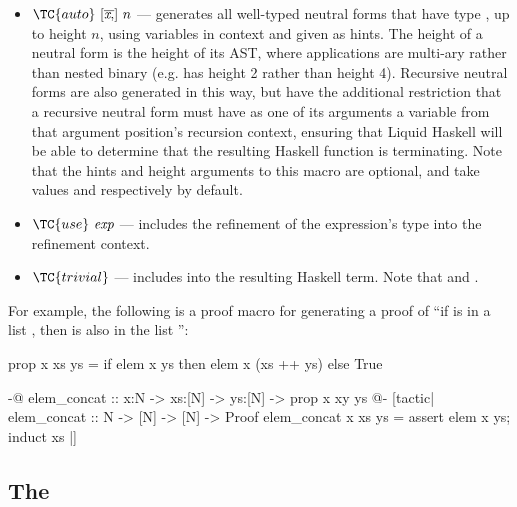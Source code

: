\begin{itemize}
\begin{itemize}
    \item
    $\TC{auto} ~ [\overline{\textit{x} ,}] ~ n$ --- generates all well-typed neutral forms that have type , up to height $n$, using variables in context and given as hints. 
    The height of a neutral form is the height of its AST, where applications are multi-ary rather than nested binary (e.g.  has height 2 rather than height 4).
    Recursive neutral forms are also generated in this way, but have the additional restriction that a recursive neutral form must have as one of its arguments a variable from that argument position's recursion context, ensuring that Liquid Haskell will be able to determine that the resulting Haskell function is terminating.
    Note that the hints and height arguments to this macro are optional, and take values \code{[]} and  respectively by default.
    \item $\TC{use} ~ \textit{exp}$ --- includes the refinement of the expression's type into the refinement context.
    \item $\TC{trivial}$ --- includes  into the resulting Haskell term. Note that  and .
  \end{itemize}
\end{itemize}

For example, the following is a proof macro for generating a proof of ``if  is in a list , then  is also in the list '':
\begin{code}
  prop x xs ys = if elem x ys then elem x (xs ++ ys) else True

  {-@ elem_concat :: x:N -> xs:[N] -> ys:[N] -> {prop x xy ys} @-}
  [tactic|
  elem_concat :: N -> [N] -> [N] -> Proof
  elem_concat x xs ys =
    assert {elem x ys};
    induct xs
  |]
\end{code}

\subsection{The \LangB}

